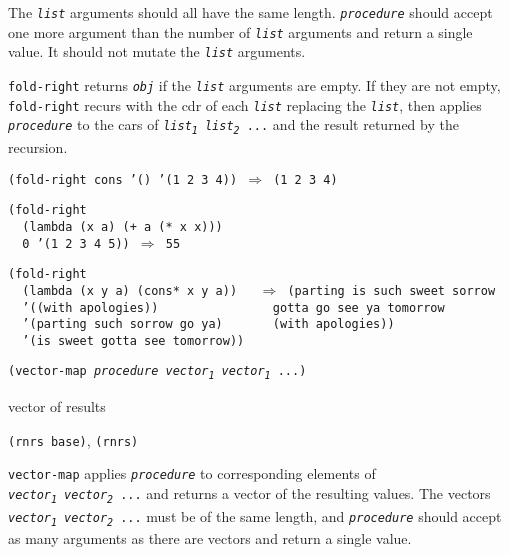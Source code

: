 \label{control_s42}\label{control_s43}The \texttt{\textit{list}} arguments should all have the same length.
\texttt{\textit{procedure}} should accept one more argument than the number of \texttt{\textit{list}}
arguments and return a single value.
It should not mutate the \texttt{\textit{list}} arguments.

\texttt{fold-right} returns \texttt{\textit{obj}} if the \texttt{\textit{list}} arguments are empty.
If they are not empty, \texttt{fold-right} recurs with the cdr of each
\texttt{\textit{list}} replacing the \texttt{\textit{list}}, then applies
\texttt{\textit{procedure}} to the cars of \texttt{\textit{list\textsubscript{1}} \textit{list\textsubscript{2}} ...} and
the result returned by the recursion.

\begin{alltt}
(fold-right cons '() '(1 2 3 4)) \(\Rightarrow\) (1 2 3 4)

(fold-right
  (lambda (x a) (+ a (* x x)))
  0 '(1 2 3 4 5)) \(\Rightarrow\) 55

(fold-right
  (lambda (x y a) (cons* x y a))   \(\Rightarrow\) (parting is such sweet sorrow
  '((with apologies))                gotta go see ya tomorrow
  '(parting such sorrow go ya)       (with apologies))
  '(is sweet gotta see tomorrow))
\end{alltt}

\begin{description}

\label{control_s44}\item[procedure] \texttt{(vector-map \textit{procedure} \textit{vector\textsubscript{1}} \textit{vector\textsubscript{1}} ...)}



\item[returns] vector of results


\item[libraries] \texttt{(rnrs base)}, \texttt{(rnrs)}
\end{description}


\label{control_s45}\label{control_s46}\texttt{vector-map} applies \texttt{\textit{procedure}} to corresponding
elements of \texttt{\textit{vector\textsubscript{1}} \textit{vector\textsubscript{2}} ...} and returns a
vector of the resulting values.
The vectors \texttt{\textit{vector\textsubscript{1}} \textit{vector\textsubscript{2}} ...} must be of the same length, and
\texttt{\textit{procedure}} should accept as many arguments as there are vectors and
return a single value.


